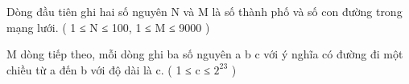 Dòng đầu tiên ghi hai số nguyên N và M là số thành phố và số con đường trong mạng lưới. ( 1 ≤ N ≤ 100,  1 ≤ M ≤ 9000 )  

   M dòng tiếp theo, mỗi dòng ghi ba số nguyên a b c với ý nghĩa có đường đi một chiều từ a đến b với độ dài là c. ( 1 ≤ c ≤ $2^{23}$   )